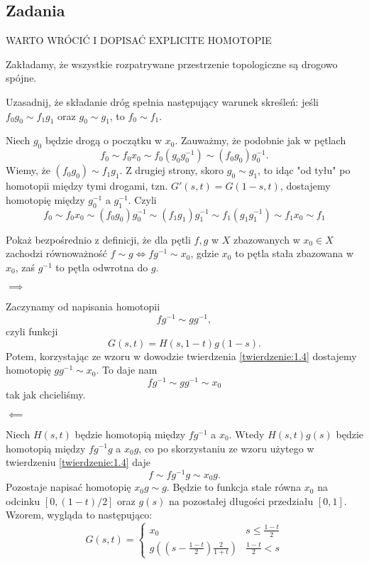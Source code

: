 \subsection{Zadania}

{\large\color{red}WARTO WRÓCIĆ I DOPISAĆ EXPLICITE HOMOTOPIE}

Zakładamy, że wszystkie rozpatrywane przestrzenie topologiczne są drogowo spójne.

\begin{problem}
  Uzasadnij, że składanie dróg spełnia następujący warunek skreśleń: jeśli $f_0g_0\sim f_1g_1$ oraz $g_0\sim g_1$, to $f_0\sim f_1$.
\end{problem}

\begin{solution}
  Niech $g_0$ będzie drogą o początku w $x_0$. Zauważmy, że podobnie jak w pętlach
  $$f_0\sim f_0 x_0\sim f_0(g_0g_0^{-1})\sim (f_0g_0)g_0^{-1}.$$
  Wiemy, że $(f_0g_0)\sim f_1g_1$. Z drugiej strony, skoro $g_0\sim g_1$, to idąc "od tyłu" po homotopii między tymi drogami, tzn. $G'(s, t)=G(1-s, t)$, dostajemy homotopię między $g_0^{-1}$ a $g_1^{-1}$. Czyli
  $$f_0\sim f_0x_0\sim (f_0g_0)g_0^{-1}\sim (f_1g_1)g_1^{-1}\sim f_1(g_1g_1^{-1})\sim f_1x_0\sim f_1$$
\end{solution}

\begin{problem}
  Pokaż bezpośrednio z definicji, że dla pętli $f,g$ w $X$ zbazowanych w $x_0\in X$ zachodzi równoważność $f\sim g\iff f g^{-1}\sim x_0$, gdzie $x_0$ to pętla stała zbazowana w $x_0$, zaś $g^{-1}$ to pętla odwrotna do $g$.
\end{problem}

\begin{solution}
  $\implies$
  
  Zaczynamy od napisania homotopii 
  $$fg^{-1} \sim gg^{-1},$$ 
  czyli funkcji
  $$G(s, t)=H(s, 1-t)g(1-s).$$ 
  Potem, korzystając ze wzoru w dowodzie twierdzenia \ref{twierdzenie:1.4} dostajemy homotopię $gg^{-1}\sim x_0$. To daje nam 
  $$fg^{-1}\sim gg^{-1}\sim x_0$$ 
  tak jak chcieliśmy.

  $\impliedby$

  Niech $H(s, t)$ będzie homotopią między $fg^{-1}$ a $x_0$. Wtedy $H(s, t)g(s)$ będzie homotopią między $fg^{-1}g$ a $x_0g$, co po skorzystaniu ze wzoru użytego w twierdzeniu \ref{twierdzenie:1.4} daje
  $$f\sim fg^{-1}g\sim x_0g.$$
  Pozostaje napisać homotopię $x_0g\sim g$. Będzie to funkcja stale równa $x_0$ na odcinku $[0, (1-t)/2]$ oraz $g(s)$ na pozostałej długości przedziału $[0,1]$. Wzorem, wygląda to następująco:
  $$G(s, t)=\begin{cases}
  x_0&s\leq \frac{1-t}{2}\\ g\left(\left(s-\frac{1-t}{2}\right)\frac{2}{1+t}\right)&\frac{1-t}{2}<s\end{cases}$$
\end{solution}

